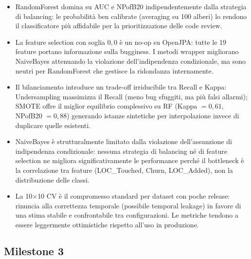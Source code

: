 \begin{itemize}
    \item RandomForest domina su AUC e NPofB20 indipendentemente dalla strategia di
    balancing: le probabilità ben calibrate (averaging su 100 alberi) lo rendono il
    classificatore più affidabile per la prioritizzazione delle code review.

    \item La feature selection con soglia $0{,}0$ è un no-op su OpenJPA: tutte le 19
    feature portano informazione sulla bugginess. I metodi wrapper migliorano NaiveBayes
    attenuando la violazione dell'indipendenza condizionale, ma sono neutri per
    RandomForest che gestisce la ridondanza internamente.

    \item Il bilanciamento introduce un trade-off irriducibile tra Recall e Kappa:
    Undersampling massimizza il Recall (meno bug sfuggiti, ma più falsi allarmi);
    SMOTE offre il miglior equilibrio complessivo su RF (Kappa $= 0{,}61$, NPofB20 $= 0{,}88$)
    generando istanze sintetiche per interpolazione invece di duplicare quelle esistenti.

    \item NaiveBayes è strutturalmente limitato dalla violazione dell'assunzione di
    indipendenza condizionale: nessuna strategia di balancing né di feature selection
    ne migliora significativamente le performance perché il bottleneck è la correlazione
    tra feature (LOC\_Touched, Churn, LOC\_Added), non la distribuzione delle classi.

    \item La 10$\times$10 CV è il compromesso standard per dataset con poche release:
    rinuncia alla correttezza temporale (possibile temporal leakage) in favore di una
    stima stabile e confrontabile tra configurazioni. Le metriche tendono a essere
    leggermente ottimistiche rispetto all'uso in produzione.
\end{itemize}

\subsection{Milestone 3}

